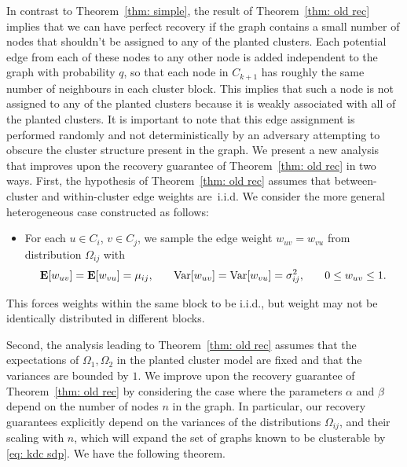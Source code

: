 \documentclass[twoside,11pt]{article}
\newcommand{\E}{\mathbf{E}}
\newcommand{\0}{\bs{0}}
\begin{document}
{In contrast to Theorem~\ref{thm: simple}, the result of Theorem~\ref{thm: old rec} implies that we can have perfect recovery if the graph contains a small number of nodes that shouldn't be assigned to any of the planted clusters.
Each potential edge from each of these nodes to any other node is added independent to the graph with probability $q$, so that each node in $C_{k+1}$ has roughly the same number of neighbours in each cluster block. This implies that such a node is not assigned to any of the planted clusters because it is weakly associated with all of the planted clusters. It is important to note that this edge assignment is performed randomly and not deterministically by an adversary attempting to obscure the cluster structure present in the graph.
%
We present a new analysis that improves upon the recovery guarantee of Theorem~\ref{thm: old rec} in two ways.
First, the hypothesis of Theorem~\ref{thm: old rec} assumes that between-cluster and within-cluster edge weights are~i.i.d. We consider the more general heterogeneous case constructed as follows:
\begin{itemize}
	\item For each $u \in C_i$, $v \in C_j$, we sample the edge weight $w_{uv} = w_{vu}$ from distribution $\Omega_{ij}$ with
	\[
	\E[w_{uv}]  = \E[w_{vu}] = \mu_{ij}, \hspace{0.25in}
	\text{Var}[w_{uv}] = \text{Var}[w_{vu}] = \sigma^2_{ij},
	\hspace{0.25in}
	0 \le w_{uv} \le 1.
	\]
\end{itemize}
This forces weights within the same block to be i.i.d., but weight may not be identically distributed in different blocks.

Second, the analysis leading to Theorem~\ref{thm: old rec} assumes that the expectations of \(\Omega_{1}, \Omega_2\)
in the planted cluster model are fixed and that the variances are bounded by \(1\).
We improve upon the recovery guarantee of Theorem~\ref{thm: old rec} by considering the case
where the parameters \(\alpha\) and \(\beta\) depend on the number of nodes \(n\) in the graph.
In particular, our recovery guarantees explicitly depend on the
variances of the distributions \(\Omega_{ij}\), and their scaling with $n$, which will expand the set of graphs
known to be clusterable by \eqref{eq: kdc sdp}. We have the following theorem.

}
\end{document}
